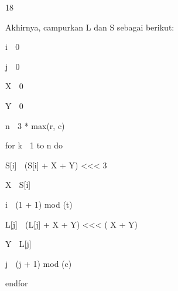 \documentclass{article}
\begin{document}

18

Akhirnya, campurkan L dan S sebagai berikut: 

i  0 

j  0 

X  0 

Y  0 

n  3 * max(r, c) 

for k  1 to n do 

    S[i]  (S[i] + X + Y) <<< 3 

    X  S[i] 

    i  (1 + 1) mod (t) 

    L[j]  (L[j] + X + Y) <<< ( X + Y) 

    Y  L[j] 

    j  (j + 1) mod (c) 

endfor
\end{document}
